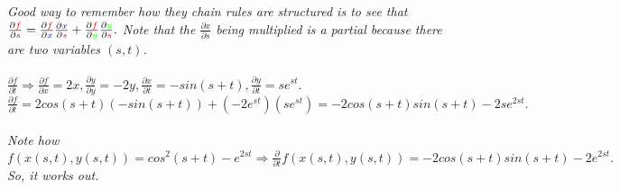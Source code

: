 \documentclass[addpoints]{exam}
\begin{document}
\textit{
Good way to remember how they chain rules are structured is to see that $\frac{\partial \color{red}{f}}{\partial \color{purple}{s}}=\frac{\partial \color{red}{f}}{\partial \color{blue}{x}}\frac{\partial \color{blue}{x}}{\partial \color{purple}{s}}+\frac{\partial \color{red}{f}}{\partial \color{green}{y}}\frac{\partial \color{green}{y}}{\partial \color{purple}{s}}.$ Note that the $\frac{\partial x}{\partial s}$ being multiplied is a partial because there are two variables $(s,t)$.
}\\\\
\textit{
$\frac{\partial f}{\partial t} \Rightarrow \frac{\partial f}{\partial x}=2x, \frac{\partial y}{\partial y}=-2y, \frac{\partial x}{\partial t}= -sin(s+t), \frac{\partial y}{\partial t}=se^{st}.$ $\frac{\partial f}{\partial t}=2cos(s+t)(-sin(s+t))+(-2e^{st})(se^{st})=-2cos(s+t)sin(s+t)-2se^{2st}.$\\\\
Note how $f(x(s,t),y(s,t))= cos^2(s+t) - e^{2st} \Rightarrow \frac{\partial}{\partial t}f(x(s,t),y(s,t))=-2cos(s+t)sin(s+t)-2e^{2st}.$ So, it works out.
}
\end{document}
